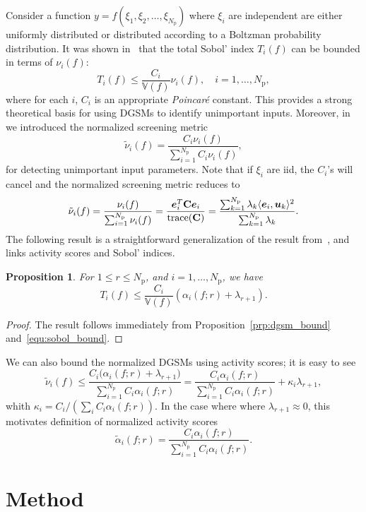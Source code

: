 \documentclass[11pt]{article}
\renewcommand{\vec}[1]{{\mathchoice
                     {\mbox{\boldmath$\displaystyle{#1}$}}
                     {\mbox{\boldmath$\textstyle{#1}$}}
                     {\mbox{\boldmath$\scriptstyle{#1}$}}
                     {\mbox{\boldmath$\scriptscriptstyle{#1}$}}}}
\newcommand{\V}{\mathbb{V}}
\newcommand{\ip}[2]{\langle{#1}, {#2}\rangle}
\newcommand{\trace}{\mathrm{trace}}
\newcommand{\mat}[1]{\mathbf{{#1}}}
\newcommand{\Np}{{N_\text{p}}}
\newtheorem{proposition}{Proposition}[section]
\begin{document}
Consider a function $y = f(\xi_1, \xi_2, \ldots, \xi_\Np)$ where
$\xi_i$ are independent are either uniformly distributed or
distributed according to a Boltzman probability distribution.  
It was shown in~\cite{LamboniIoossPopelinEtAl13} that the total Sobol' 
index $T_i(f)$ can be bounded in terms of $\nu_i(f)$:
\begin{equation}\label{equ:sobol_bound}
T_i(f) \leq \frac{C_i}{\V(f)}\nu_i(f), \quad i = 1, \ldots, \Np,
\end{equation}
where for each $i$, $C_i$ is an appropriate \emph{Poincar\'{e}} constant.
This provides a strong theoretical basis for using DGSMs to identify 
unimportant inputs. Moreover, 
in~\cite{VohraAlexanderianSaftaEtAl18} we introduced the normalized screening metric
\[
   \tilde{\nu}_i(f) = \frac{C_i \nu_i(f)}{\sum_{i=1}^\Np C_i \nu_i(f)},
\]
for detecting unimportant input parameters. 
Note that if $\xi_i$ are iid, the $C_i$'s will cancel and the normalized screening
metric reduces to 
\[
    \tilde{\nu}_i(f) = \frac{\nu_i(f)}{\sum_{i=1}^\Np \nu_i(f)} 
      = \frac{\vec{e}_i^T \mat{C} \vec{e}_i}{\trace(\mat{C})} 
      = \frac{\sum_{k=1}^\Np \lambda_k \ip{\vec{e}_i}{\vec{u}_k}^2}{\sum_{k = 1}^\Np \lambda_k}.
\]
The following result is a straightforward generalization of
the result from~\cite{Diaz16}, and 
links activity scores and Sobol' indices.
\begin{proposition}
For $1 \leq r \leq \Np$, and $i = 1, \ldots, \Np$, we have
\[
       T_i(f) \leq \frac{C_i}{\V(f)}(\alpha_i(f; r) + \lambda_{r+1}).
\]
\end{proposition}
\begin{proof}
The result follows immediately from Proposition~\ref{prp:dgsm_bound} and~\eqref{equ:sobol_bound}.
\end{proof}
We can also bound the normalized DGSMs using activity scores; it is easy to see  
\[
\tilde{\nu}_i(f) \leq 
\frac{ C_i \big(\alpha_i(f; r) + \lambda_{r+1}\big)}{\sum_{i=1}^\Np C_i \alpha_i(f; r)}
=\frac{C_i \alpha_i(f; r)}{\sum_{i=1}^\Np C_i \alpha_i(f; r)} + \kappa_i \lambda_{r+1}, 
\]
whith $\kappa_i = C_i / (\sum_i C_i \alpha_i(f; r))$. 
In the case where where $\lambda_{r+1} \approx 0$, 
this motivates definition of
normalized activity scores
\[
   \tilde{\alpha}_i(f; r) =  \frac{C_i \alpha_i(f; r)}{\sum_{i=1}^\Np C_i \alpha_i(f; r)}.
\] 

\section{Method}
\end{document}
